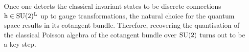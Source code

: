 Once one detects the classical invariant states to be discrete connections $\text{\normalfont h}\in\text{\normalfont SU}(2)^{\text{\normalfont L}}$ up to gauge transformations, the natural choice for the quantum space results in its cotangent bundle. Therefore, recovering the quantisation of the classical Poisson algebra of the cotangent bundle over $\text{\normalfont SU}(2)$ turns out to be a key step.\\ %




